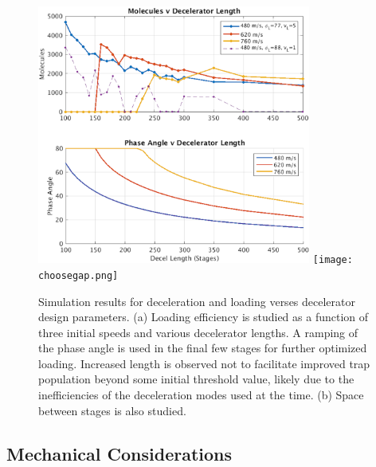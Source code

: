 \begin{figure}[t!]
\includegraphics[width=9cm]{Slowing/mp_elength_phaseload.png}
\texttt{[image: choosegap.png]}
\caption[Decelerator Length Simulation]{\label{fig:mp_elength_phaseload}
Simulation results for deceleration and loading verses decelerator design parameters. (a) Loading efficiency is studied as a function of three initial speeds and various decelerator lengths. A ramping of the phase angle is used in the final few stages for further optimized loading. Increased length is observed not to facilitate improved trap population beyond some initial threshold value, likely due to the inefficiencies of the deceleration modes used at the time. (b) Space between stages is also studied.}
\end{figure}



\subsection{Mechanical Considerations}\label{sec:mechconsider}

